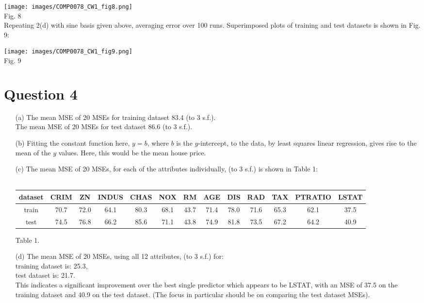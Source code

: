 \documentclass[a4paper,12pt]{article}
\begin{document}
\texttt{[image: images/COMP0078\_CW1\_fig8.png]}\\
Fig. 8 \\

Repeating 2(d) with sine basis given above, averaging error over 100 runs. Superimposed plots of training and test datasets is shown in Fig. 9:

\texttt{[image: images/COMP0078\_CW1\_fig9.png]}\\
Fig. 9 \\

\clearpage

\section*{Question 4}

\begin{enumerate}
\item[(a)] 
The mean MSE of 20 MSEs for training dataset 83.4 (to 3 s.f.).\\
The mean MSE of 20 MSEs for test dataset 86.6 (to 3 s.f.).
\item[(b)] 
Fitting the constant function here,  $y = b$, where $b$ is the $y$-intercept, to the data, by least squares linear regression, gives rise to the mean of the $y$ values. Here, this would be the mean house price.
\item[(c)] 
The mean MSE of 20 MSEs, for each of the attributes individually, (to 3 s.f.) is shown in Table 1:\\\\
{\tiny
\begin{tabular}{|c|c|c|c|c|c|c|c|c|c|c|c|c|}
\hline
dataset&CRIM&ZN&INDUS&CHAS&NOX&RM&AGE&DIS&RAD&TAX&PTRATIO&LSTAT\\
\hline
train&70.7&72.0&64.1&80.3&68.1&43.7&71.4&78.0&71.6&65.3&62.1&37.5\\
\hline
test&74.5&76.8&66.2&85.6&71.1&43.8&74.9&81.8&73.5&67.2&64.2&40.9\\
\hline
\end{tabular}\par 
}
Table 1.

\item[(d)] 
The mean MSE of 20 MSEs, using all 12 attributes, (to 3 s.f.) for:\\
training dataset is:  25.3,\\
test dataset is: 21.7.\\
This indicates a significant improvement over the best single predictor which appears to be LSTAT, with an MSE of 37.5 on the training dataset and 40.9 on the test dataset. (The focus in particular should be on comparing the test dataset MSEs).

\end{enumerate}
\clearpage
\end{document}
